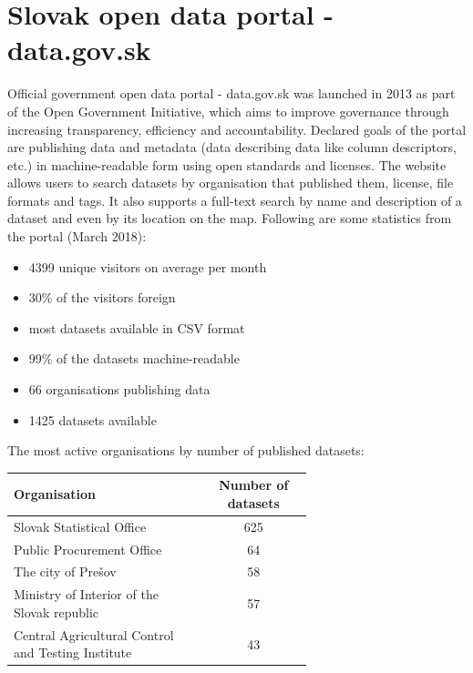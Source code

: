 \documentclass[thesis=B,english]{sprlajur-slovakopendata}[2018/05/12]
\begin{document}
\section{Slovak open data portal - data.gov.sk}
Official government open data portal - data.gov.sk was launched in 2013 as part of the Open Government Initiative, which aims to improve governance through increasing transparency, efficiency and accountability. Declared goals of the portal are publishing data and metadata (data describing data like column descriptors, etc.) in machine-readable form using open standards and licenses. The website allows users to search datasets by organisation that published them, license, file formats and tags. It also supports a full-text search by name and description of a dataset and even by its location on the map.
Following are some statistics from the portal (March 2018):
\begin{itemize}
	\item 4399 unique visitors on average per month
	\item 30\% of the visitors foreign 
	\item most datasets available in CSV format
	\item  99\% of the datasets machine-readable
	\item 66 organisations publishing data
	\item 1425 datasets available
\end{itemize}
The most active organisations by number of published datasets:
\begin{center}
	\label{toporganisations}
	\begin{tabular}{  p{0.65\linewidth} | c }
		\textbf{Organisation}                              & \textbf{Number of datasets} \\ \hline
		Slovak Statistical Office                          & 625                         \\
		Public Procurement Office                          & 64                          \\
		The city of Prešov                                & 58                          \\
		Ministry of Interior of the Slovak republic        & 57                          \\
		Central Agricultural Control and Testing Institute & 43                          \\
	\end{tabular}
\end{center}
\end{document}
